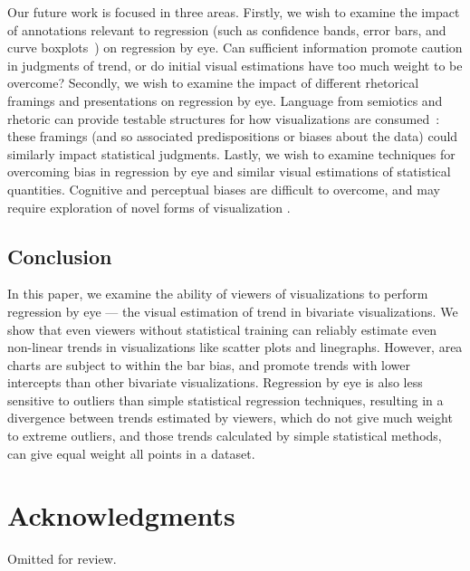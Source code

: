 \documentclass{sigchi}
\begin{document}
Our future work is focused in three areas. Firstly, we wish to examine the impact of annotations relevant to regression (such as confidence bands, error bars, and curve boxplots~\cite{mirzargar2014curve}) on regression by eye. Can sufficient information promote caution in judgments of trend, or do initial visual estimations have too much weight to be overcome? Secondly, we wish to examine the impact of different rhetorical framings and presentations on regression by eye. Language from semiotics and rhetoric can provide testable structures for how visualizations are consumed~\cite{hullman2011visualization}: these framings (and so associated predispositions or biases about the data) could similarly impact statistical judgments. Lastly, we wish to examine techniques for overcoming bias in regression by eye and similar visual estimations of statistical quantities. Cognitive and perceptual biases are difficult to overcome, and may require exploration of novel forms of visualization \cite{micallef2012assessing}.

\subsection{Conclusion}

In this paper, we examine the ability of viewers of visualizations to perform regression by eye --- the visual estimation of trend in bivariate visualizations. We show that even viewers without statistical training can reliably estimate even non-linear trends in visualizations like scatter plots and linegraphs. However, area charts are subject to within the bar bias, and promote trends with lower intercepts than other bivariate visualizations. Regression by eye is also less sensitive to outliers than simple statistical regression techniques, resulting in a divergence between trends estimated by viewers, which do not give much weight to extreme outliers, and those trends calculated by simple statistical methods, can give equal weight all points in a dataset.


\section{Acknowledgments}

Omitted for review.

%
%
%
%
%
\balance{}




\end{document}

